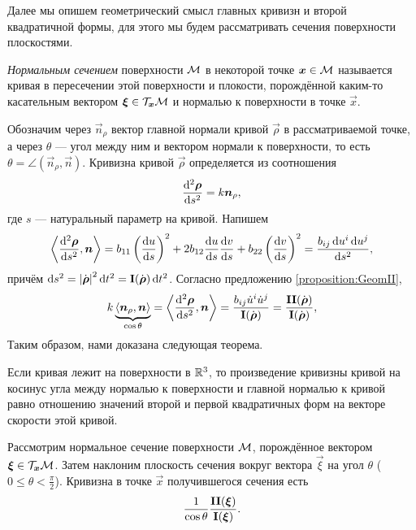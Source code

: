 Далее мы опишем геометрический смысл главных кривизн и второй квадратичной формы, для этого мы будем рассматривать сечения поверхности плоскостями. 

\begin{definition}
	\textit{Нормальным сечением} поверхности $\mathcal{M}$ в некоторой точке $\boldsymbol{x} \in \mathcal{M}$ называется кривая в пересечении этой поверхности и плокости, порождённой каким-то касательным вектором $\boldsymbol{\xi} \in \mathcal{T}_{\boldsymbol{x}}\mathcal{M}$ и нормалью к поверхности в точке $\vec{x}$.
\end{definition}

 Обозначим через $\vec{n}_\rho$ вектор главной нормали кривой $\vec{\rho}$ в рассматриваемой точке, а через $\theta$ --- угол между ним и вектором нормали к поверхности, то есть $\theta = \angle(\vec{n}_\rho, \vec{n})$. Кривизна\footnotemark{} кривой $\vec{\rho}$ определяется из соотношения
\[
	\frac{\mathop{}\!\mathrm{d}^2\boldsymbol{\rho}}{\mathop{}\!\mathrm{d} s^2} = k\boldsymbol{n}_\rho,
\]
где $s$ --- натуральный параметр на кривой. Напишем
\[
	\left\langle\frac{\d^2\vec{\rho}}{\d s^2}, \vec{n}\right\rangle = b_{11}\br{\frac{\d u}{\d s}}^2 + 2b_{12}\frac{\d u}{\d s}\frac{\d v}{\d s} + b_{22}\br{\frac{\d v}{\d s}}^2 = \frac{b_{ij}\d u^i\d u^j}{\d s^2},
\]
причём $\mathop{}\!\mathrm{d} s^2 = \left\lvert\dot{\boldsymbol{\rho}}\right\rvert^2\mathop{}\!\mathrm{d} t^2 = \boldsymbol{\operatorname{I}}(\dot{\boldsymbol{\rho}})\mathop{}\!\mathrm{d} t^2$. Согласно предложению \ref{proposition:GeomII},
\[
	k\underbrace{\langle\boldsymbol{n}_\rho, \boldsymbol{n}\rangle}_{\cos\theta} = \left\langle\frac{\mathop{}\!\mathrm{d}^2\boldsymbol{\rho}}{\mathop{}\!\mathrm{d} s^2}, \boldsymbol{n}\right\rangle = \frac{b_{ij}\dot{u}^i\dot{u}^j}{\boldsymbol{\operatorname{I}}(\dot{\boldsymbol{\rho}})} = \frac{\boldsymbol{\operatorname{II}}(\dot{\boldsymbol{\rho}})}{\boldsymbol{\operatorname{I}}(\dot{\boldsymbol{\rho}})},
\]
Таким образом, нами доказана следующая теорема.


\begin{theorem}
	Если кривая лежит на поверхности в $\mathbb{R}^3$, то произведение кривизны кривой на косинус угла между нормалью к поверхности и главной нормалью к кривой равно отношению значений второй и первой квадратичных форм на векторе скорости этой кривой.
\end{theorem}

\begin{corollary} \label{theorem:Meusneir}
	Рассмотрим нормальное сечение поверхности $\mathcal{M}$, порождённое вектором $\boldsymbol{\xi} \in \mathcal{T}_{\boldsymbol{x}}\mathcal{M}$. Затем наклоним плоскость сечения вокруг вектора $\vec{\xi}$ на угол $\theta$ ($0 \leqslant \theta < \frac{\pi}{2}$). Кривизна в точке $\vec{x}$ получившегося сечения есть
	\[
		\frac{1}{\cos\theta}\frac{\boldsymbol{\operatorname{II}}(\boldsymbol{\xi})}{\boldsymbol{\operatorname{I}}(\boldsymbol{\xi})}.
	\]
\end{corollary}

